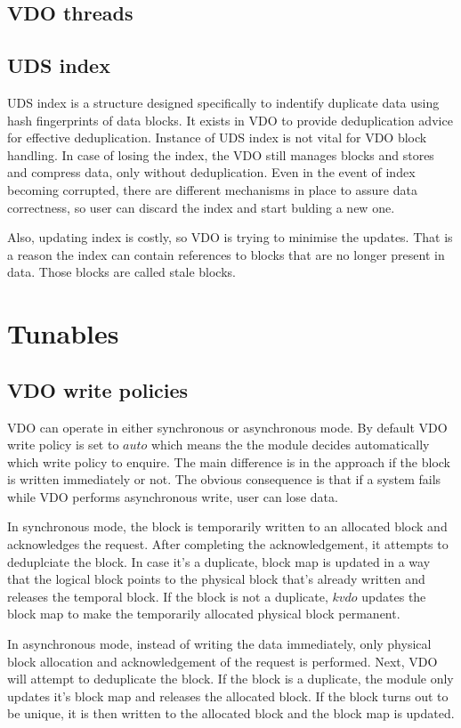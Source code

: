 \documentclass[
  color, %
  table, %
  lof,   %
  lot,   %
]{fithesis3}
\begin{document}
\subsection{VDO threads}

\subsection{UDS index}
UDS index is a structure designed specifically to indentify duplicate data using hash fingerprints of data blocks. It exists in VDO to provide deduplication advice for effective deduplication. Instance of UDS index is not vital for VDO block handling. In case of losing the index, the VDO still manages blocks and stores and compress data, only without deduplication. Even in the event of index becoming corrupted, there are different mechanisms in place to assure data correctness, so user can discard the index and start bulding a new one.

Also, updating index is costly, so VDO is trying to minimise the updates. That is a reason the index can contain references to blocks that are no longer present in data. Those blocks are called stale blocks.

\section{Tunables}

\subsection{VDO write policies}
VDO can operate in either synchronous or asynchronous mode. By default VDO write policy is set to $auto$ which means the the module decides automatically which write policy to enquire. The main difference is in the approach if the block is written immediately or not. The obvious consequence is that if a system fails while VDO performs asynchronous write, user can lose data.

In synchronous mode, the block is temporarily written to an allocated block and acknowledges the request. After completing the acknowledgement, it attempts to deduplciate the block. In case it's a duplicate, block map is updated in a way that the logical block points to the physical block that's already written and releases the temporal block. If the block is not a duplicate, $kvdo$ updates the block map to make the temporarily allocated physical block permanent.

In asynchronous mode, instead of writing the data immediately, only physical block allocation and acknowledgement of the request is performed. Next, VDO will attempt to deduplicate the block. If the block is a duplicate, the module only updates it's block map and releases the allocated block. If the block turns out to be unique, it is then written to the allocated block and the block map is updated.
\end{document}
